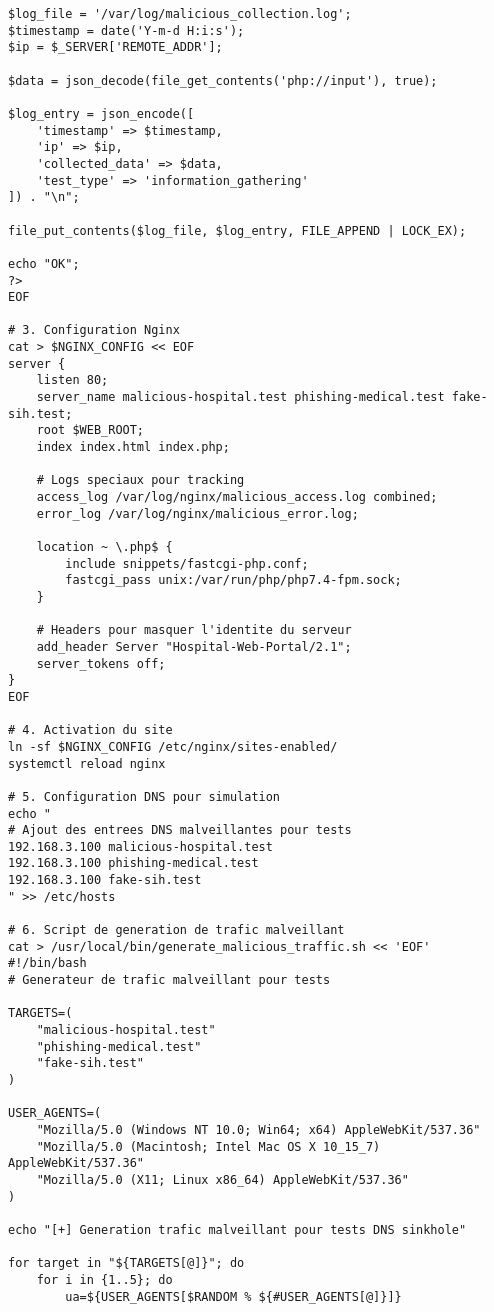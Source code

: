 \begin{lstlisting}[style=bashstyle,caption=Configuration serveur web malveillant pour tests]
$log_file = '/var/log/malicious_collection.log';
$timestamp = date('Y-m-d H:i:s');
$ip = $_SERVER['REMOTE_ADDR'];

$data = json_decode(file_get_contents('php://input'), true);

$log_entry = json_encode([
    'timestamp' => $timestamp,
    'ip' => $ip,
    'collected_data' => $data,
    'test_type' => 'information_gathering'
]) . "\n";

file_put_contents($log_file, $log_entry, FILE_APPEND | LOCK_EX);

echo "OK";
?>
EOF

# 3. Configuration Nginx
cat > $NGINX_CONFIG << EOF
server {
    listen 80;
    server_name malicious-hospital.test phishing-medical.test fake-sih.test;
    root $WEB_ROOT;
    index index.html index.php;
    
    # Logs speciaux pour tracking
    access_log /var/log/nginx/malicious_access.log combined;
    error_log /var/log/nginx/malicious_error.log;
    
    location ~ \.php$ {
        include snippets/fastcgi-php.conf;
        fastcgi_pass unix:/var/run/php/php7.4-fpm.sock;
    }
    
    # Headers pour masquer l'identite du serveur
    add_header Server "Hospital-Web-Portal/2.1";
    server_tokens off;
}
EOF

# 4. Activation du site
ln -sf $NGINX_CONFIG /etc/nginx/sites-enabled/
systemctl reload nginx

# 5. Configuration DNS pour simulation
echo "
# Ajout des entrees DNS malveillantes pour tests
192.168.3.100 malicious-hospital.test
192.168.3.100 phishing-medical.test  
192.168.3.100 fake-sih.test
" >> /etc/hosts

# 6. Script de generation de trafic malveillant
cat > /usr/local/bin/generate_malicious_traffic.sh << 'EOF'
#!/bin/bash
# Generateur de trafic malveillant pour tests

TARGETS=(
    "malicious-hospital.test"
    "phishing-medical.test"
    "fake-sih.test"
)

USER_AGENTS=(
    "Mozilla/5.0 (Windows NT 10.0; Win64; x64) AppleWebKit/537.36"
    "Mozilla/5.0 (Macintosh; Intel Mac OS X 10_15_7) AppleWebKit/537.36"
    "Mozilla/5.0 (X11; Linux x86_64) AppleWebKit/537.36"
)

echo "[+] Generation trafic malveillant pour tests DNS sinkhole"

for target in "${TARGETS[@]}"; do
    for i in {1..5}; do
        ua=${USER_AGENTS[$RANDOM % ${#USER_AGENTS[@]}]}
        

\end{lstlisting}
